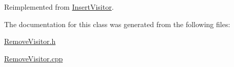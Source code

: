 Reimplemented from \hyperlink{classInsertVisitor_a6257a7684631f6ce7cf15855eb99c8f5}{Insert\+Visitor}.



The documentation for this class was generated from the following files\+:\begin{DoxyCompactItemize}
\item 
\hyperlink{RemoveVisitor_8h}{Remove\+Visitor.\+h}\item 
\hyperlink{RemoveVisitor_8cpp}{Remove\+Visitor.\+cpp}\end{DoxyCompactItemize}
